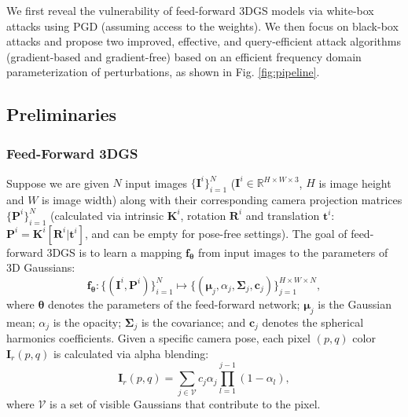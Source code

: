 \documentclass[runningheads]{llncs}
\begin{document}
We first reveal the vulnerability of feed-forward 3DGS models via white-box attacks using PGD (assuming access to the weights). We then focus on black-box attacks and propose two improved, effective, and query-efficient attack algorithms (gradient-based and gradient-free) based on an efficient frequency domain parameterization of perturbations, as shown in Fig. \ref{fig:pipeline}. %

\subsection{ Preliminaries}
\subsubsection{Feed-Forward 3DGS}
Suppose we are given $N$ input images $\{ \bm{I}^i \}_{i=1}^N$ ($\bm{I}^i \in \mathbb{R}^{H \times W \times 3}$, $H$ is image height and $W$ is image width) along with their corresponding camera projection matrices $\{ \bm{P}^i \}_{i=1}^N$ (calculated via intrinsic $\bm{K}^i$, rotation $\bm{R}^i$ and translation $\bm{t}^i$: $\bm{P}^i=\bm{K}^i[\bm{R}^i|\bm{t}^i]$, and can be empty for pose-free settings). The goal of feed-forward 3DGS is to learn a mapping $\bm{f_\theta}$ from input images to the parameters of 3D Gaussians:
\begin{equation}
    \bm{f_{\theta}}:\{(\bm{I}^i,\bm{P}^i)\}_{i=1}^{N}\mapsto \{(\bm{\mu}_j,\alpha_j,\bm{\Sigma}_j,\bm{c}_j)\}_{j=1}^{H\times W\times N},
\end{equation}
where $\bm{\theta}$ denotes the parameters of the feed-forward network; $\bm{\mu}_j$ is the Gaussian mean; $\alpha_j$ is the opacity; $\bm{\Sigma}_j$ is the covariance; and $\bm{c}_j$ denotes the spherical harmonics coefficients. Given a specific camera pose, each pixel $(p,q)$ color $\bm{I}
_r(p,q)$ is calculated via alpha blending:
\begin{equation}
    \bm{I}_r(p,q) = \sum_{j \in \mathcal{V}} c_j \alpha_j \prod_{l=1}^{j-1} (1 - \alpha_l),
\end{equation}
where $\mathcal{V}$ is a set of visible Gaussians that contribute to the pixel.
\end{document}

